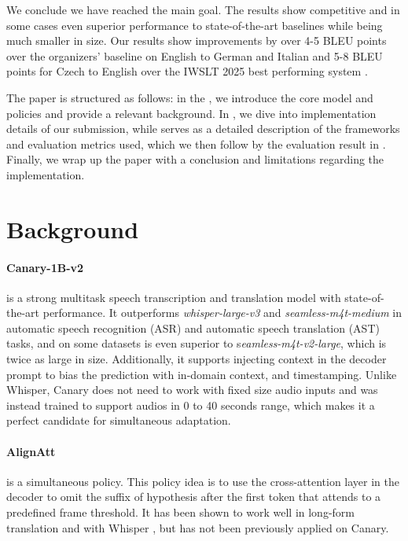 \documentclass[11pt]{article}
\begin{document}


We conclude we have reached the main goal. The results show competitive and in some cases even superior performance to state-of-the-art baselines while being much smaller in size. Our results show improvements by over 4-5 BLEU points over the organizers' baseline on English to German and Italian and 5-8 BLEU points for Czech to English over the IWSLT 2025 best performing system \citep{machacek-polak-2025-simultaneous}.

The paper is structured as follows: in the , we introduce the core model and policies and provide a relevant background. In , we dive into implementation details of our submission, while  serves as a detailed description of the frameworks and evaluation metrics used, which we then follow by the evaluation result in . Finally, we wrap up the paper with a conclusion and limitations regarding the implementation.


\section{Background}
\label{sec:background}
\paragraph{Canary-1B-v2} \citep{sekoyan2025canarybv} is a strong multitask speech transcription and translation model with state-of-the-art performance. It outperforms \textit{whisper-large-v3} \citep{radford2022whisper} and \textit{seamless-m4t-medium} in automatic speech recognition (ASR) and automatic speech translation (AST) tasks, and on some datasets is even superior to s\textit{eamless-m4t-v2-large}, which is twice as large in size. Additionally, it supports injecting context in the decoder prompt to bias the prediction with in-domain context, and timestamping. Unlike Whisper, Canary does not need to work with fixed size audio inputs and was instead trained to support audios in 0 to 40 seconds range, which makes it a perfect candidate for simultaneous adaptation.

\paragraph{AlignAtt} \citep{papi2023alignatt} is a simultaneous
policy. This policy idea is to use the cross-attention layer in the decoder to omit the suffix of hypothesis after the first token that attends to a predefined frame threshold. It has been shown to work well in long-form translation \cite{papi-et-al-2024-streamatt} and with Whisper \citep{wang2024simulwhisper,machacek-polak-2025-simultaneous}, but has not been previously applied on Canary.
\end{document}
